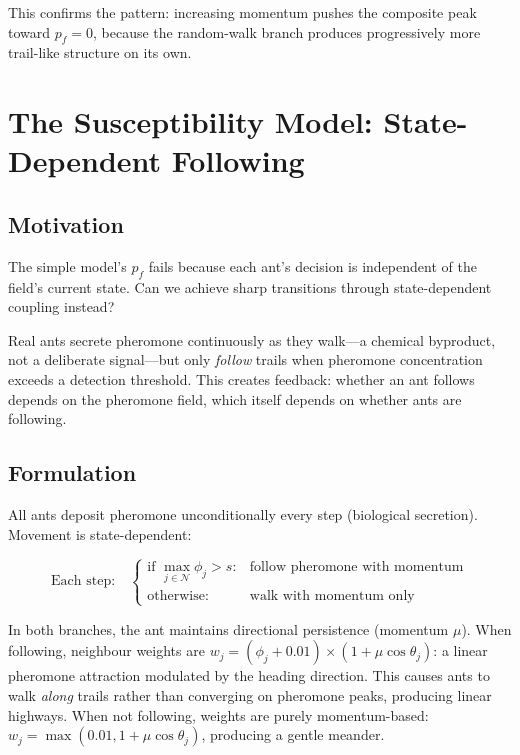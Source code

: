 \documentclass[11pt,a4paper]{article}
\begin{document}
This confirms the pattern: increasing momentum pushes the composite peak toward $p_f = 0$, because the random-walk branch produces progressively more trail-like structure on its own.

\section{The Susceptibility Model: State-Dependent Following}
\label{sec:susceptibility}

\subsection{Motivation}

The simple model's $p_f$ fails because each ant's decision is independent of the field's current state.
Can we achieve sharp transitions through state-dependent coupling instead?

Real ants secrete pheromone continuously as they walk---a chemical byproduct, not a deliberate signal---but only \emph{follow} trails when pheromone concentration exceeds a detection threshold.
This creates feedback: whether an ant follows depends on the pheromone field, which itself depends on whether ants are following.

\subsection{Formulation}

All ants deposit pheromone unconditionally every step (biological secretion).
Movement is state-dependent:

\begin{equation}
  \text{Each step:} \quad
  \begin{cases}
    \text{if } \max_{j \in \mathcal{N}} \phi_j > s: & \text{follow pheromone with momentum} \\
    \text{otherwise:} & \text{walk with momentum only}
  \end{cases}
  \label{eq:susceptibility}
\end{equation}

In both branches, the ant maintains directional persistence (momentum $\mu$).
When following, neighbour weights are $w_j = (\phi_j + 0.01) \times (1 + \mu \cos\theta_j)$: a linear pheromone attraction modulated by the heading direction.
This causes ants to walk \emph{along} trails rather than converging on pheromone peaks, producing linear highways.
When not following, weights are purely momentum-based: $w_j = \max(0.01, 1 + \mu \cos\theta_j)$, producing a gentle meander.
\end{document}
